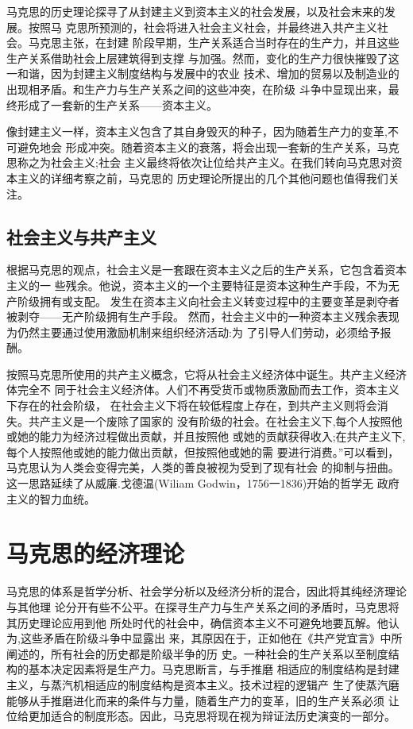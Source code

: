 马克思的历史理论探寻了从封建主义到资本主义的社会发展，以及社会末来的发展。按照马
克思所预测的，社会将进入社会主义社会，并最终进入共产主义社会。马克思主张，在封建
阶段早期，生产关系适合当时存在的生产力，并且这些生产关系借助社会上层建筑得到支撑
与加强。然而，变化的生产力很快摧毁了这一和谐，因为封建主义制度结构与发展中的农业
技术、增加的贸易以及制造业的出现相矛盾。和生产力与生产关系之间的这些冲突，在阶级
斗争中显现出来，最终形成了一套新的生产关系——资本主义。

像封建主义一样，资本主义包含了其自身毁灭的种子，因为随着生产力的变革,不可避免地会
形成冲突。随着资本主义的衰落，将会出现一套新的生产关系，马克思称之为社会主义;社会
主义最终将依次让位给共产主义。在我们转向马克思对资本主义的详细考察之前，马克思的
历史理论所提出的几个其他问题也值得我们关注。

\subsection{社会主义与共产主义}

根据马克思的观点，社会主义是一套跟在资本主义之后的生产关系，它包含着资本主义的一
些残余。他说，资本主义的一个主要特征是资本这种生产手段，不为无产阶级拥有或支配。
发生在资本主义向社会主义转变过程中的主要变革是剥夺者被剥夺——无产阶级拥有生产手段。
然而，社会主义中的一种资本主义残余表现为仍然主要通过使用激励机制来组织经济活动:为
了引导人们劳动，必须给予报酬。

按照马克思所使用的共产主义概念，它将从社会主义经济体中诞生。共产主义经济体完全不
同于社会主义经济体。人们不再受货币或物质激励而去工作，资本主义下存在的社会阶级，
在社会主义下将在较低程度上存在，到共产主义则将会消失。共产主义是一个废除了国家的
没有阶级的社会。在社会主义下,每个人按照他或她的能力为经济过程做出贡献，并且按照他
或她的贡献获得收入;在共产主义下,每个人按照他或她的能力做出贡献，但按照他或她的需
要进行消费。”可以看到，马克思认为人类会变得完美，人类的善良被视为受到了现有社会
的抑制与扭曲。这一思路延续了从威廉.戈德温(Wiliam Godwin，1756一1836)开始的哲学无
政府主义的智力血统。

\section{马克思的经济理论}

马克思的体系是哲学分析、社会学分析以及经济分析的混合，因此将其纯经济理论与其他理
论分开有些不公平。在探寻生产力与生产关系之间的矛盾时，马克思将其历史理论应用到他
所处时代的社会中，确信资本主义不可避免地要瓦解。他认为,这些矛盾在阶级斗争中显露出
来，其原因在于，正如他在《共产党宜言》中所阐述的，所有社会的历史都是阶级半争的历
史。一种社会的生产关系以至制度结构的基本决定因素将是生产力。马克思断言，与手推磨
相适应的制度结构是封建主义，与蒸汽机相适应的制度结构是资本主义。技术过程的逻辑产
生了使蒸汽磨能够从手推磨进化而来的条件与力量，随着生产力的变革，旧的生产关系必须
让位给更加适合的制度形态。因此，马克思将现在视为辩证法历史演变的一部分。

